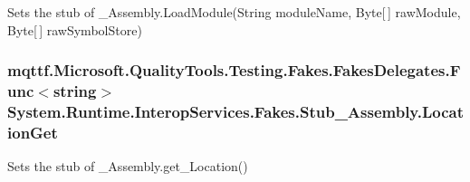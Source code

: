 Sets the stub of \-\_\-\-Assembly.\-Load\-Module(\-String module\-Name, Byte\mbox{[}$\,$\mbox{]} raw\-Module, Byte\mbox{[}$\,$\mbox{]} raw\-Symbol\-Store)

\hypertarget{class_system_1_1_runtime_1_1_interop_services_1_1_fakes_1_1_stub___assembly_a5ca647c392c4745fbcb590c6d2eb30ab}{
\subsubsection[{Location\-Get}]{\setlength{\rightskip}{0pt plus 5cm}mqttf.\-Microsoft.\-Quality\-Tools.\-Testing.\-Fakes.\-Fakes\-Delegates.\-Func$<$string$>$ System.\-Runtime.\-Interop\-Services.\-Fakes.\-Stub\-\_\-\-Assembly.\-Location\-Get}}\label{class_system_1_1_runtime_1_1_interop_services_1_1_fakes_1_1_stub___assembly_a5ca647c392c4745fbcb590c6d2eb30ab}


Sets the stub of \-\_\-\-Assembly.\-get\-\_\-\-Location()

